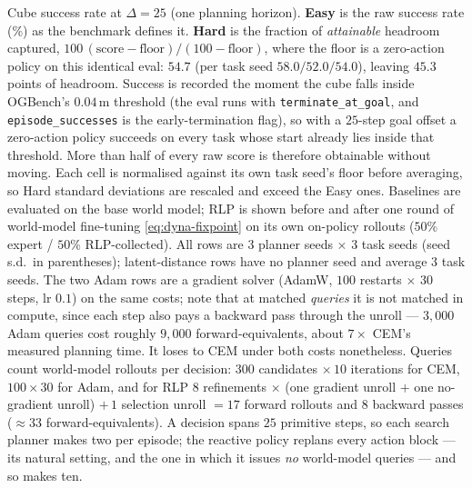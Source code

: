 %
\begin{table}[t]
\centering
\caption{Cube success rate at $\Delta = 25$ (one planning horizon).
\textbf{Easy} is the raw success rate (\%) as the benchmark defines it.
\textbf{Hard} is the fraction of \emph{attainable} headroom captured,
$100\,(\text{score}-\text{floor})/(100-\text{floor})$, where the floor is a
zero-action policy on this identical eval: $54.7$ (per task seed
$58.0/52.0/54.0$), leaving $45.3$ points of headroom. Success is recorded the
moment the cube falls inside OGBench's $0.04$\,m threshold (the eval runs with
\texttt{terminate\_at\_goal}, and \texttt{episode\_successes} is the
early-termination flag), so with a $25$-step goal offset a zero-action policy
succeeds on every task whose start already lies inside that threshold. More than
half of every raw score is therefore obtainable without moving.
Each cell is normalised against its own task seed's floor before averaging, so
Hard standard deviations are rescaled and exceed the Easy ones. Baselines are
evaluated on the base world model; RLP is shown before and after one round of
world-model fine-tuning \eqref{eq:dyna-fixpoint} on its own on-policy rollouts
($50\%$ expert / $50\%$ RLP-collected). All rows are $3$ planner seeds $\times$ $3$
task seeds (seed s.d.\ in parentheses); latent-distance rows have no planner seed
and average $3$ task seeds. The two Adam rows are a gradient solver (AdamW,
$100$ restarts $\times$ $30$ steps, lr $0.1$) on the same costs; note that at
matched \emph{queries} it is not matched in compute, since each step also pays a
backward pass through the unroll --- $3{,}000$ Adam queries cost roughly $9{,}000$
forward-equivalents, about $7\times$ CEM's measured planning time. It loses to
CEM under both costs nonetheless. Queries count world-model rollouts per
decision: $300$ candidates $\times\,10$ iterations for CEM, $100 \times 30$ for
Adam, and for RLP $8$ refinements
$\times$ (one gradient unroll $+$ one no-gradient unroll) $+\,1$ selection unroll
$= 17$ forward rollouts and $8$ backward passes ($\approx\!33$
forward-equivalents). A decision spans $25$ primitive steps, so each search
planner makes two per episode; the reactive policy replans every action block ---
its natural setting, and the one in which it issues \emph{no} world-model queries
--- and so makes ten.}
\label{tab:cube-h25-rlp}

\end{table}
